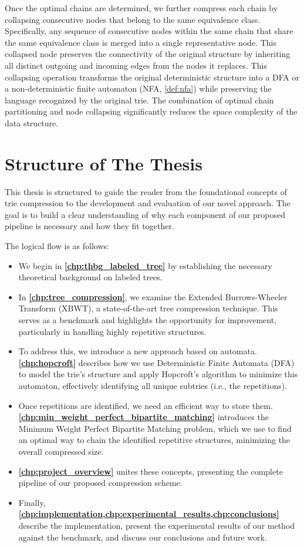 Once the optimal chains are determined, we further compress each chain by collapsing consecutive nodes that belong to the same equivalence class. Specifically, any sequence of consecutive nodes within the same chain that share the same equivalence class is merged into a single representative node. This collapsed node preserves the connectivity of the original structure by inheriting all distinct outgoing and incoming edges from the nodes it replaces. This collapsing operation transforms the original deterministic structure into a DFA or a non-deterministic finite automaton (NFA, \cref{def:nfa}) while preserving the language recognized by the original trie. The combination of optimal chain partitioning and node collapsing significantly reduces the space complexity of the data structure.

\section{Structure of The Thesis}
This thesis is structured to guide the reader from the foundational concepts of trie compression to the development and evaluation of our novel approach. The goal is to build a clear understanding of why each component of our proposed pipeline is necessary and how they fit together.

The logical flow is as follows:
\begin{itemize}
    \item We begin in \textbf{\cref{chp:thbg_labeled_tree}} by establishing the necessary theoretical background on labeled trees.
    \item In \textbf{\cref{chp:tree_compression}}, we examine the Extended Burrows-Wheeler Transform (XBWT), a state-of-the-art tree compression technique. This serves as a benchmark and highlights the opportunity for improvement, particularly in handling highly repetitive structures.
    \item To address this, we introduce a new approach based on automata. \textbf{\cref{chp:hopcroft}} describes how we use Deterministic Finite Automata (DFA) to model the trie's structure and apply Hopcroft's algorithm to minimize this automaton, effectively identifying all unique subtries (i.e., the repetitions).
    \item Once repetitions are identified, we need an efficient way to store them. \textbf{\cref{chp:min_weight_perfect_bipartite_matching}} introduces the Minimum Weight Perfect Bipartite Matching problem, which we use to find an optimal way to chain the identified repetitive structures, minimizing the overall compressed size.
    \item \textbf{\cref{chp:project_overview}} unites these concepts, presenting the complete pipeline of our proposed compression scheme.
    \item Finally, \textbf{\cref{chp:implementation,chp:experimental_results,chp:conclusions}} describe the implementation, present the experimental results of our method against the benchmark, and discuss our conclusions and future work.
\end{itemize}
